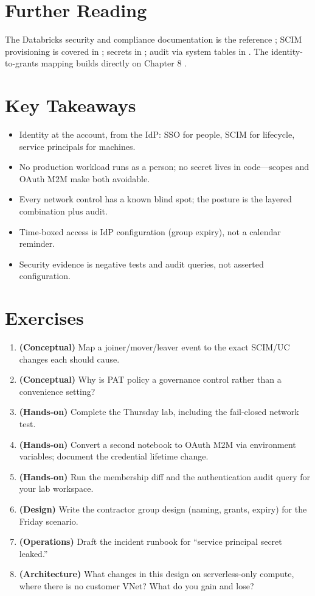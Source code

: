 \section{Further Reading}
The Databricks security and compliance documentation is the reference \cite{databricksSecurity}; SCIM provisioning is covered in \cite{databricksSCIM}; secrets in \cite{databricksSecretScopes}; audit via system tables in \cite{databricksSystemTables}. The identity-to-grants mapping builds directly on Chapter 8 \cite{databricksUnityCatalog}.

\section*{Key Takeaways}
\begin{itemize}
    \item Identity at the account, from the IdP: SSO for people, SCIM for lifecycle, service principals for machines.
    \item No production workload runs as a person; no secret lives in code---scopes and OAuth M2M make both avoidable.
    \item Every network control has a known blind spot; the posture is the layered combination plus audit.
    \item Time-boxed access is IdP configuration (group expiry), not a calendar reminder.
    \item Security evidence is negative tests and audit queries, not asserted configuration.
\end{itemize}

\section{Exercises}
\begin{enumerate}
    \item \textbf{(Conceptual)} Map a joiner/mover/leaver event to the exact SCIM/UC changes each should cause.
    \item \textbf{(Conceptual)} Why is PAT policy a governance control rather than a convenience setting?
    \item \textbf{(Hands-on)} Complete the Thursday lab, including the fail-closed network test.
    \item \textbf{(Hands-on)} Convert a second notebook to OAuth M2M via environment variables; document the credential lifetime change.
    \item \textbf{(Hands-on)} Run the membership diff and the authentication audit query for your lab workspace.
    \item \textbf{(Design)} Write the contractor group design (naming, grants, expiry) for the Friday scenario.
    \item \textbf{(Operations)} Draft the incident runbook for ``service principal secret leaked.''
    \item \textbf{(Architecture)} What changes in this design on serverless-only compute, where there is no customer VNet? What do you gain and lose?
\end{enumerate}
